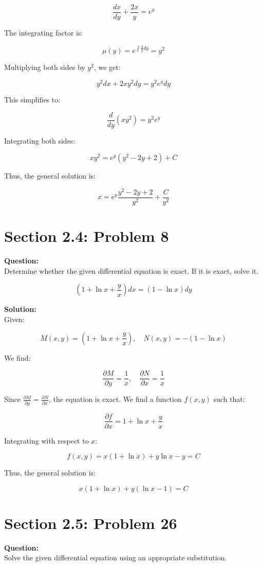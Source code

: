\documentclass[12pt]{article}
\begin{document}
\[
\frac{dx}{dy} + \frac{2x}{y} = e^{y}
\]

The integrating factor is:

\[
\mu(y) = e^{\int \frac{2}{y}dy} = y^2
\]

Multiplying both sides by \(y^2\), we get:

\[
y^2dx + 2xy^2dy = y^2e^{y}dy
\]

This simplifies to:

\[
\frac{d}{dy}(xy^2) = y^2e^{y}
\]

Integrating both sides:

\[
xy^2 = e^{y}(y^2 - 2y + 2) + C
\]

Thus, the general solution is:

\[
x = e^{y}\frac{y^2 - 2y + 2}{y^2} + \frac{C}{y^2}
\]

\newpage

\section*{Section 2.4: Problem 8}
\raggedright
\textbf{Question:} \\
Determine whether the given differential equation is exact. If it is exact, solve it.

\[
\left(1 + \ln x + \frac{y}{x}\right)dx = (1 - \ln x)dy
\]

\textbf{Solution:} \\
Given:

\[
M(x,y) = \left(1 + \ln x + \frac{y}{x}\right), \quad N(x,y) = -(1 - \ln x)
\]

We find:

\[
\frac{\partial M}{\partial y} = \frac{1}{x}, \quad \frac{\partial N}{\partial x} = \frac{1}{x}
\]

Since \( \frac{\partial M}{\partial y} = \frac{\partial N}{\partial x} \), the equation is exact. We find a function \(f(x, y)\) such that:

\[
\frac{\partial f}{\partial x} = 1 + \ln x + \frac{y}{x}
\]

Integrating with respect to \(x\):

\[
f(x,y) = x(1 + \ln x) + y \ln x - y = C
\]

Thus, the general solution is:

\[
x(1 + \ln x) + y(\ln x - 1) = C
\]

\newpage

\section*{Section 2.5: Problem 26}
\raggedright
\textbf{Question:} \\
Solve the given differential equation using an appropriate substitution.
\end{document}
